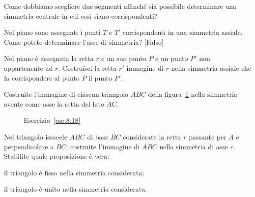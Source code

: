 \begin{esercizio}
\label{ese:8.5}
Come dobbiamo scegliere due segmenti affinché sia possibile 
determinare una simmetria centrale in cui essi siano corrispondenti?
\end{esercizio}

\begin{esercizio}
\label{ese:8.16}
Nel piano sono assegnati i punti $T$ e $T'$ corrispondenti in una 
simmetria assiale. Come potete determinare l'asse di simmetria?
\hfill[Falso]
\end{esercizio}

\noindent\begin{minipage}{0.6\textwidth}\parindent15pt
\begin{esercizio}
\label{ese:8.17}
Nel piano è assegnata la retta $r$ e un suo punto $P$ e un punto $P'$ 
non appartenente ad $r$. Costruisci la retta $r'$ immagine di $r$ 
nella simmetria assiale che fa corrispondere al punto $P$ il punto 
$P'$.
\end{esercizio}
\end{minipage}\hfil
\begin{minipage}{0.4\textwidth}
  \centering
\end{minipage}\vspace{5pt}

\begin{esercizio}
\label{ese:8.18}
Costruite l'immagine di ciascun triangolo $ABC$ della 
figura~\ref{fig:ese8.18} nella simmetria avente come asse la retta 
del lato $AC$.
\end{esercizio}


\begin{inaccessibleblock}
 \begin{figure}[!htb]
  \centering
  \caption{Esercizio~\ref{ese:8.18}}\label{fig:ese8.18}
\end{figure}
\end{inaccessibleblock}

\begin{esercizio}
\label{ese:8.19}
Nel triangolo isoscele $ABC$ di base $BC$ considerate la retta $r$ 
passante per $A$ e perpendicolare a $BC$; costruite l'immagine di 
$ABC$ nella simmetria di asse $r$. Stabilite quale proposizione è 
vera:
\begin{enumeratea}
\item il triangolo è fisso nella simmetria considerata;
\item il triangolo è unito nella simmetria considerata.
\end{enumeratea}
\end{esercizio}

